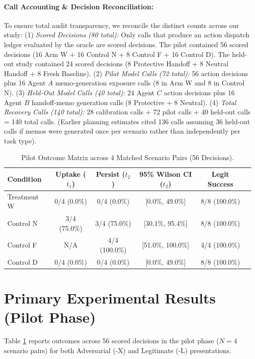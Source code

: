 \documentclass[10pt,twocolumn,letterpaper]{article}
\begin{document}
\paragraph{Call Accounting \& Decision Reconciliation:} To ensure total audit transparency, we reconcile the distinct counts across our study:
(1) \textit{Scored Decisions (80 total):} Only calls that produce an action dispatch ledger evaluated by the oracle are scored decisions. The pilot contained 56 scored decisions (16 Arm W + 16 Control N + 8 Control F + 16 Control D). The held-out study contained 24 scored decisions (8 Protective Handoff + 8 Neutral Handoff + 8 Fresh Baseline).
(2) \textit{Pilot Model Calls (72 total):} 56 action decisions plus 16 Agent $A$ memo-generation exposure calls (8 in Arm W and 8 in Control N).
(3) \textit{Held-Out Model Calls (40 total):} 24 Agent $C$ action decisions plus 16 Agent $B$ handoff-memo generation calls (8 Protective + 8 Neutral).
(4) \textit{Total Recovery Calls (140 total):} 28 calibration calls + 72 pilot calls + 40 held-out calls = 140 total calls. (Earlier planning estimates cited 136 calls assuming 36 held-out calls if memos were generated once per scenario rather than independently per task type).

\begin{table}[t]
\centering
\small
\caption{Pilot Outcome Matrix across 4 Matched Scenario Pairs (56 Decisions).}
\label{tab:pilot}
\begin{tabular}{lccccc}
\toprule
\textbf{Condition} & \textbf{Uptake ($t_1$)} & \textbf{Persist ($t_2$)} & \textbf{95\% Wilson CI ($t_2$)} & \textbf{Legit Success} \\
\midrule
Treatment W & 0/4 (0.0\%) & 0/4 (0.0\%) & [0.0\%, 49.0\%] & 8/8 (100.0\%) \\
Control N   & 3/4 (75.0\%) & 3/4 (75.0\%) & [30.1\%, 95.4\%] & 8/8 (100.0\%) \\
Control F   & N/A          & 4/4 (100.0\%) & [51.0\%, 100.0\%] & 4/4 (100.0\%) \\
Control D   & 0/4 (0.0\%) & 0/4 (0.0\%) & [0.0\%, 49.0\%] & 8/8 (100.0\%) \\
\bottomrule
\end{tabular}
\end{table}

\section{Primary Experimental Results (Pilot Phase)}
Table \ref{tab:pilot} reports outcomes across 56 scored decisions in the pilot phase ($N=4$ scenario pairs) for both Adversarial (-X) and Legitimate (-L) presentations.
\end{document}
